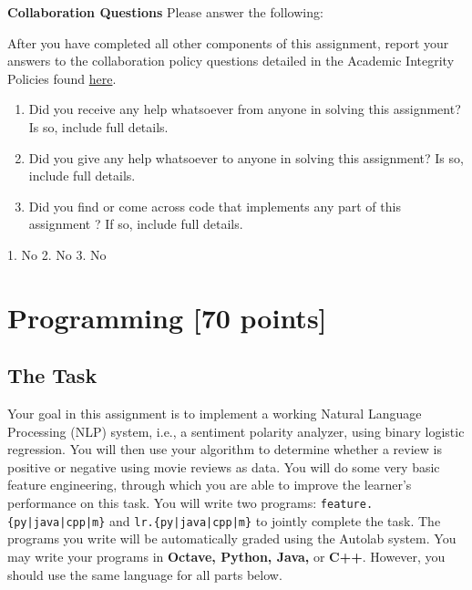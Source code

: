 \documentclass[11pt]{article}
\numberwithin{equation}{section} %
\numberwithin{figure}{section} %
\numberwithin{table}{section} %
\begin{document}
\newpage

\textbf{Collaboration Questions} Please answer the following:


    After you have completed all other components of this assignment, report your answers to the collaboration policy questions detailed in the Academic Integrity Policies found \href{http://www.cs.cmu.edu/~mgormley/courses/10601/about.html#7-academic-integrity-policies}{here}.
    \begin{enumerate}
        \item Did you receive any help whatsoever from anyone in solving this assignment? Is so, include full details.
        \item Did you give any help whatsoever to anyone in solving this assignment? Is so, include full details.
        \item Did you find or come across code that implements any part of this assignment ? If so, include full details.
    \end{enumerate}
    
    \begin{solution}
    1. No
    2. No
    3. No
    \end{solution}

\newpage

\section{Programming [70 points]}
\label{programming}

\subsection{The Task}\label{task}

Your goal in this assignment is to implement a working Natural Language Processing (NLP) system, i.e., a sentiment polarity analyzer, using binary logistic regression. You will then use your algorithm to determine whether a review is positive or negative using movie reviews as data. You will do some very basic feature engineering, through which you are able to improve the learner's performance on this task. You will write two programs: \texttt{feature.\{py|java|cpp|m\}} and \texttt{lr.\{py|java|cpp|m\}} to jointly complete the task. The programs you write will be automatically graded using the Autolab system. You may write your programs in {\bf Octave, Python, Java,} or {\bf C++}. However, you should use the same language for all parts below.
\end{document}
